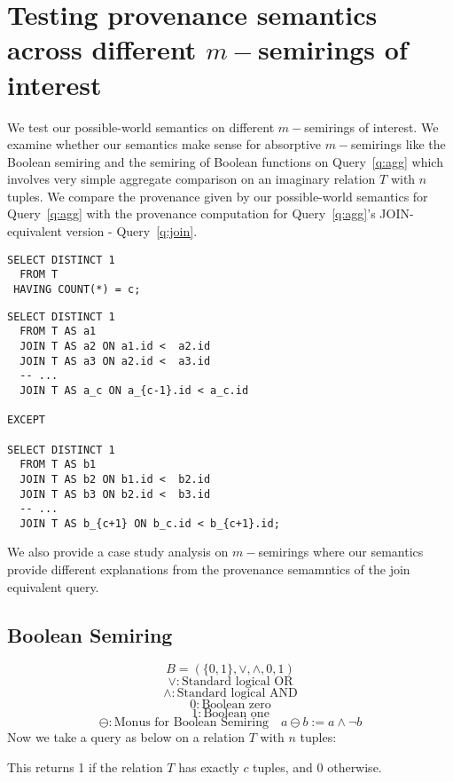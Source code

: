 \section{Testing provenance semantics across different $m-$semirings of interest}
We test our possible-world semantics on different $m-$semirings of interest. We examine whether our semantics make 
sense for absorptive $m-$semirings like the Boolean semiring and the semiring of Boolean functions on Query~\ref{q:agg} which involves very simple aggregate comparison on an imaginary relation $T$ with 
$n$ tuples. We compare the provenance given by our possible-world 
semantics for Query~\ref{q:agg} with the provenance computation for Query~\ref{q:agg}'s \textsc{JOIN}-equivalent version - Query~\ref{q:join}.   

\begin{listing}[h!]
    \label{q:agg}
  \begin{verbatim}
SELECT DISTINCT 1
  FROM T
 HAVING COUNT(*) = c;
\end{verbatim}
\end{listing}
\begin{listing}[h!]
    \label{q:join}
\begin{verbatim}
SELECT DISTINCT 1
  FROM T AS a1
  JOIN T AS a2 ON a1.id <  a2.id
  JOIN T AS a3 ON a2.id <  a3.id
  -- ...
  JOIN T AS a_c ON a_{c-1}.id < a_c.id

EXCEPT

SELECT DISTINCT 1
  FROM T AS b1
  JOIN T AS b2 ON b1.id <  b2.id
  JOIN T AS b3 ON b2.id <  b3.id
  -- ...
  JOIN T AS b_{c+1} ON b_c.id < b_{c+1}.id;
\end{verbatim}
\end{listing}
We also provide a case study analysis on $m-$semirings where our semantics 
provide different explanations from the provenance semamntics of the join equivalent query.
\subsection{Boolean Semiring}
$$B = (\{0,1\}, \lor, \land, 0, 1)$$
$$\lor : \text{Standard logical OR}$$
$$\land : \text{Standard logical AND}$$
$$0 : \text{Boolean zero}$$
$$1 : \text{Boolean one}$$
\[
\ominus: \text{Monus for Boolean Semiring} \quad a \ominus b := a \land \neg b
\]
Now we take a query as below on a relation $T$ with $n$ tuples:

This returns 1 if the relation $T$ has exactly $c$ tuples, and 0 otherwise.

